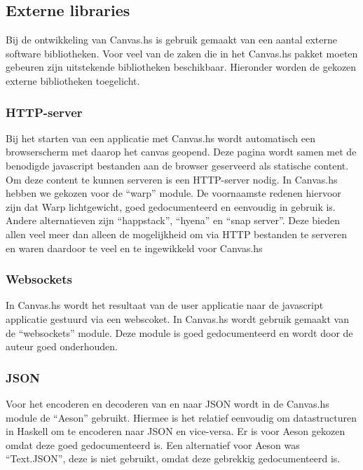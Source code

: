 \subsection{Externe libraries}
\label{subsec:externe_libraries}
Bij de ontwikkeling van Canvas.hs is gebruik gemaakt van een aantal externe software bibliotheken. Voor veel van de zaken die in het Canvas.hs pakket moeten gebeuren zijn uitstekende bibliotheken beschikbaar. Hieronder worden de gekozen externe bibliotheken toegelicht.


\subsubsection{HTTP-server}
Bij het starten van een applicatie met Canvas.hs wordt automatisch een browserscherm met daarop het canvas geopend. Deze pagina wordt samen met de benodigde javascript bestanden aan de browser geserveerd als statische content. Om deze content te kunnen serveren is een HTTP-server nodig. In Canvas.hs hebben we gekozen voor de ``warp''\cite{Warp} module. De voornaamste redenen hiervoor zijn dat Warp lichtgewicht, goed gedocumenteerd en eenvoudig in gebruik is. Andere alternatieven zijn ``happstack''\cite{Happstack}, ``hyena''\cite{Hyena} en ``snap server''\cite{SnapServer}. Deze bieden allen veel meer dan alleen de mogelijkheid om via HTTP bestanden te serveren en waren daardoor te veel en te ingewikkeld voor Canvas.hs

\subsubsection{Websockets}
In Canvas.hs wordt het resultaat van de user applicatie naar de javascript applicatie gestuurd via een webscoket. In Canvas.hs wordt gebruik gemaakt van de ``websockets'' module. Deze module is goed gedocumenteerd en wordt door de auteur goed onderhouden.

\subsubsection{JSON}
Voor het encoderen en decoderen van en naar JSON wordt in de Canvas.hs module de ``Aeson''\cite{Aeson} gebruikt. Hiermee is het relatief eenvoudig om datastructuren in Haskell om te encoderen naar JSON en vice-versa. Er is voor Aeson gekozen omdat deze goed gedocumenteerd is. Een alternatief voor Aeson was ``Text.JSON'', deze is niet gebruikt, omdat deze gebrekkig gedocumenteerd is.

